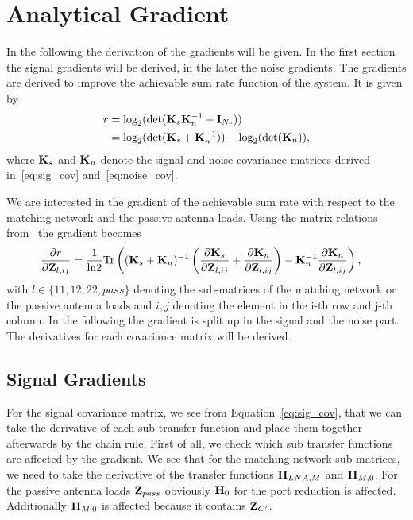 \chapter{Analytical Gradient}

In the following the derivation of the gradients will be given.
In the first section the signal gradients will be derived, in the later the noise gradients.
The gradients are derived to improve the achievable sum rate function of the system.
It is given by
\begin{align}
\label{eq:sum_rate}
r &= \text{log}_2(\text{det}(\mathbf{K}_s\mathbf{K}_n^{-1} + \mathbf{I}_{N_r}))\\\nonumber 
&= \text{log}_2(\text{det}(\mathbf{K}_s+\mathbf{K}_n^{-1})) - \text{log}_2(\text{det}(\mathbf{K}_n)),
\end{align}
where $\mathbf{K}_s$ and $\mathbf{K}_n$ denote the signal and noise covariance matrices derived in~\eqref{eq:sig_cov} and~\eqref{eq:noise_cov}.

We are interested in the gradient of the achievable sum rate with respect to the matching network and the passive antenna loads.
Using the matrix relations from~\cite{Codebook12} the gradient becomes
\begin{align}
\label{eq:gradient}
\frac{\partial r}{\partial\mathbf{Z}_{l,ij}} &= \frac{1}{\text{ln}2} 
\text{Tr}\left((\mathbf{K}_s + \mathbf{K}_n)^{-1}
\left(\frac{\partial\mathbf{K}_s}{\partial\mathbf{Z}_{l,ij}}+
 \frac{\partial\mathbf{K}_n}{\partial\mathbf{Z}_{l,ij}}\right)- 
 \mathbf{K}_n^{-1}\frac{\partial\mathbf{K}_n}{\partial\mathbf{Z}_{l,ij}}\right),
\end{align}
with $l\in\{11,12,22,pass\}$ denoting the sub-matrices of the matching network or the passive antenna loads and $i,j$ denoting the element in the i-th row and j-th column.
In the following the gradient is split up in the signal and the noise part.
The derivatives for each covariance matrix will be derived.

\section{Signal Gradients}
\label{sec:signal_gradient}
 For the signal covariance matrix, we see from Equation~\eqref{eq:sig_cov}, that we can take the derivative of each sub transfer function and place them together afterwards by the chain rule.
First of all, we check which sub transfer functions are affected by the gradient.
We see that for the matching network sub matrices, we need to take the derivative of the transfer functions $\mathbf{H}_{LNA,M}$ and $\mathbf{H}_{M,0}$.
For the passive antenna loads $\mathbf{Z}_{pass}$ obviously $\mathbf{H}_{0}$ for the port reduction is affected.
Additionally $\mathbf{H}_{M,0}$ is affected because it contains $\mathbf{Z}_{C'}$.

